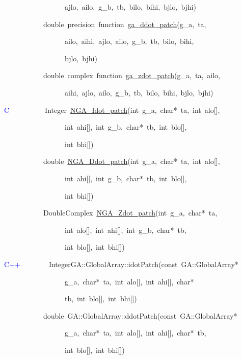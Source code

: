 ~~~~~~~~~~~~~~~~~ajlo,~ailo,~g\_b,~tb,~bilo,~bihi,~bjlo,~bjhi)~

~~~~~~~~~~~double~precision~function~\href{http://www.emsl.pnl.gov/docs/global/ga_ops.html\#ga_ddot_patch}{ga\_{}ddot\_{}patch}(g\_a,~ta,~

~~~~~~~~~~~~~~~~~ailo,~aihi,~ajlo,~ailo,~g\_b,~tb,~bilo,~bihi,~

~~~~~~~~~~~~~~~~~bjlo,~bjhi)~

~~~~~~~~~~~double~complex~function~\href{http://www.emsl.pnl.gov/docs/global/ga_ops.html\#ga_zdot_patch}{ga\_{}zdot\_{}patch}(g\_a,~ta,~ailo,~

~~~~~~~~~~~~~~~~~aihi,~ajlo,~ailo,~g\_b,~tb,~bilo,~bihi,~bjlo,~bjhi)



\textcolor{blue}{C}~~~~~~~~~~Integer~\href{http://www.emsl.pnl.gov/docs/global/c_nga_ops.html\#ga_dot_patch}{NGA\_{}Idot\_{}patch}(int~g\_a,~char{*}~ta,~int~alo{[}{]},~

~~~~~~~~~~~~~~~~~int~ahi{[}{]},~int~g\_b,~char{*}~tb,~int~blo{[}{]},~

~~~~~~~~~~~~~~~~~int~bhi{[}{]})~

~~~~~~~~~~~double~\href{http://www.emsl.pnl.gov/docs/global/c_nga_ops.html\#ga_dot_patch}{NGA\_{}Ddot\_{}patch}(int~g\_a,~char{*}~ta,~int~alo{[}{]},~

~~~~~~~~~~~~~~~~~int~ahi{[}{]},~int~g\_b,~char{*}~tb,~int~blo{[}{]},~

~~~~~~~~~~~~~~~~~int~bhi{[}{]})~

~~~~~~~~~~~DoubleComplex~\href{http://www.emsl.pnl.gov/docs/global/c_nga_ops.html\#ga_dot_patch}{NGA\_{}Zdot\_{}patch}(int~g\_a,~char{*}~ta,~

~~~~~~~~~~~~~~~~~int~alo{[}{]},~int~ahi{[}{]},~int~g\_b,~char{*}~tb,~

~~~~~~~~~~~~~~~~~int~blo{[}{]},~int~bhi{[}{]})



\textcolor{blue}{C++~}~~~~~~~IntegerGA::GlobalArray::idotPatch(const~GA::GlobalArray{*}

~~~~~~~~~~~~~~~~~g\_a,~char{*}~ta,~int~alo{[}{]},~int~ahi{[}{]},~char{*}~

~~~~~~~~~~~~~~~~~tb,~int~blo{[}{]},~int~bhi{[}{]})~

~~~~~~~~~~~double~GA::GlobalArray::ddotPatch(const~GA::GlobalArray{*}

~~~~~~~~~~~~~~~~~g\_a,~char{*}~ta,~int~alo{[}{]},~int~ahi{[}{]},~char{*}~tb,~

~~~~~~~~~~~~~~~~~int~blo{[}{]},~int~bhi{[}{]})~

